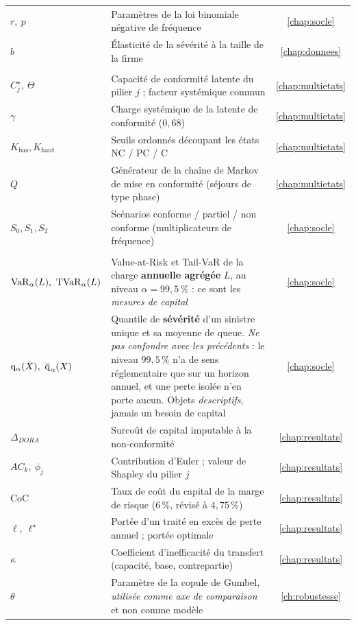 {\begin{longtable}{>{\raggedright}p{3.3cm} >{\raggedright\arraybackslash}p{10.2cm} c}
$r,\ p$ & Paramètres de la loi binomiale négative de fréquence & \ref{chap:socle} \\
$b$ & Élasticité de la sévérité à la taille de la firme & \ref{chap:donnees} \\
\midrule
\multicolumn{3}{@{}l}{\emph{\textcolor{navy}{Conformité multi-états}}} \\
$C^\star_j,\ \Theta$ & Capacité de conformité latente du pilier $j$ ; facteur systémique commun & \ref{chap:multietats} \\
$\gamma$ & Charge systémique de la latente de conformité ($0{,}68$) & \ref{chap:multietats} \\
$K_{\text{bas}},K_{\text{haut}}$ & Seuils ordonnés découpant les états NC / PC / C & \ref{chap:multietats} \\
$Q$ & Générateur de la chaîne de Markov de mise en conformité (séjours de type phase) & \ref{chap:multietats} \\
$S_0,S_1,S_2$ & Scénarios conforme / partiel / non conforme (multiplicateurs de fréquence) & \ref{chap:socle} \\
\midrule
\multicolumn{3}{@{}l}{\emph{\textcolor{navy}{Capital, allocation et décision}}} \\
$\mathrm{VaR}_\alpha(L),\ \mathrm{TVaR}_\alpha(L)$ & Value-at-Risk et Tail-VaR de la charge \textbf{annuelle agrégée} $L$, au niveau $\alpha=99{,}5\,\%$ : ce sont les \emph{mesures de capital} & \ref{chap:socle} \\
$\mathrm{q}_\alpha(X),\ \overline{\mathrm{q}}_\alpha(X)$ & Quantile de \textbf{sévérité} d'un sinistre unique et sa moyenne de queue. \emph{Ne pas confondre avec les précédents} : le niveau $99{,}5\,\%$ n'a de sens réglementaire que sur un horizon annuel, et une perte isolée n'en porte aucun. Objets \emph{descriptifs}, jamais un besoin de capital & \ref{chap:socle} \\
$\Delta_{DORA}$ & Surcoût de capital imputable à la non-conformité & \ref{chap:resultats} \\
$AC_k,\ \phi_j$ & Contribution d'Euler ; valeur de Shapley du pilier $j$ & \ref{chap:resultats} \\
$\mathrm{CoC}$ & Taux de coût du capital de la marge de risque ($6\,\%$, révisé à $4{,}75\,\%$) & \ref{chap:resultats} \\
$\ell,\ \ell^\star$ & Portée d'un traité en excès de perte annuel ; portée optimale & \ref{chap:resultats} \\
$\kappa$ & Coefficient d'inefficacité du transfert (capacité, base, contrepartie) & \ref{chap:resultats} \\
$\theta$ & Paramètre de la copule de Gumbel, \emph{utilisée comme axe de comparaison} et non comme modèle & \ref{ch:robustesse} \\
\end{longtable}
}

\clearpage


